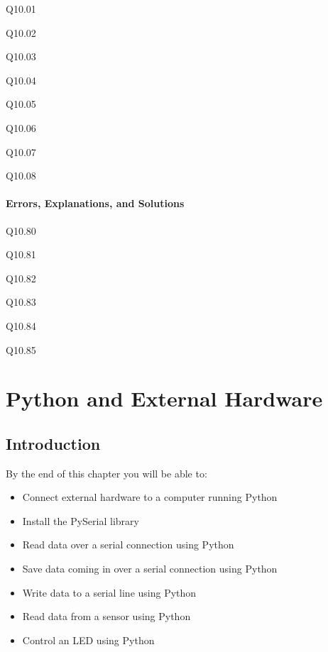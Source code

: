 \documentclass{book}
\newenvironment{problems}{}{}  %
\begin{document}
    
        \begin{problems}
        Q10.01

Q10.02

Q10.03

Q10.04

Q10.05

Q10.06

Q10.07

Q10.08
        \end{problems}

    




    
        \subsubsection{Errors, Explanations, and
Solutions}\label{errors-explanations-and-solutions}

Q10.80

Q10.81

Q10.82

Q10.83

Q10.84

Q10.85
    




    
        \chapter{Python and External
Hardware}\label{python-and-external-hardware}
    




    
        \section{Introduction}\label{introduction}
    




    
        By the end of this chapter you will be able to:

\begin{itemize}
\item
  Connect external hardware to a computer running Python
\item
  Install the PySerial library
\item
  Read data over a serial connection using Python
\item
  Save data coming in over a serial connection using Python
\item
  Write data to a serial line using Python
\item
  Read data from a sensor using Python
\item
  Control an LED using Python
\end{itemize}
        \newpage
\end{document}

